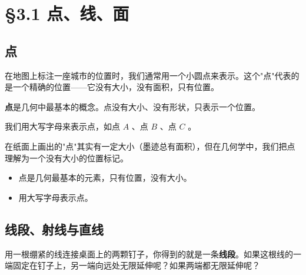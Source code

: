 \chapter{§3.1 点、线、面}
\label{sec:3.1}





\section*{点}


\begin{explore}


在地图上标注一座城市的位置时，我们通常用一个小圆点来表示。这个"点"代表的是一个精确的位置——它没有大小，没有面积，只有位置。

\end{explore}

\begin{understand}


\textbf{点}是几何中最基本的概念。点没有大小、没有形状，只表示一个位置。

我们用大写字母来表示点，如点 $A$ 、点 $B$ 、点 $C$ 。

在纸面上画出的"点"其实有一定大小（墨迹总有面积），但在几何学中，我们把点理解为一个没有大小的位置标记。

\end{understand}

\begin{keytakeaway}


\begin{itemize}
  \item 点是几何最基本的元素，只有位置，没有大小。
  \item 用大写字母表示点。
\end{itemize}


\end{keytakeaway}



\section*{线段、射线与直线}


\begin{explore}


用一根绷紧的线连接桌面上的两颗钉子，你得到的就是一条\textbf{线段}。如果这根线的一端固定在钉子上，另一端向远处无限延伸呢？如果两端都无限延伸呢？

\end{explore}

